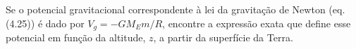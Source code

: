 Se o potencial gravitacional correspondente à lei da gravitação de Newton (eq. (4.25)) é dado por $V_g = -GM_Em/R$, encontre a expressão exata que define esse potencial em função da altitude, $z$, a partir da superfície da Terra.

